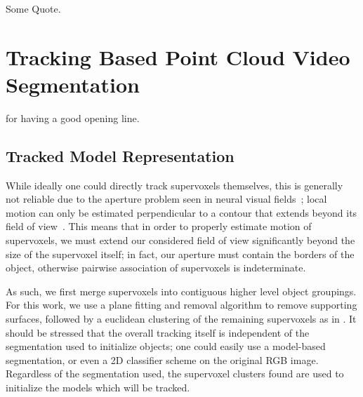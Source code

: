 \begin{savequote}[75mm]
Some Quote.
\end{savequote}


\chapter{Tracking Based Point Cloud Video Segmentation}
 for having a good opening line. 

\section{Tracked Model Representation}
While ideally one could directly track supervoxels themselves, this is generally not reliable due to the aperture problem seen in neural visual fields~\cite{MarrApertureProblem}; local motion can only be estimated perpendicular to a contour that extends beyond its field of view~\cite{shimojo1989}. This means that in order to properly estimate motion of supervoxels, we must extend our considered field of view significantly beyond the size of the supervoxel itself; in fact, our aperture must contain the borders of the object, otherwise pairwise association of supervoxels is indeterminate. 

As such, we first merge supervoxels into contiguous higher level object groupings. For this work, we use a plane fitting and removal algorithm to remove supporting surfaces, followed by a euclidean clustering of the remaining supervoxels as in \cite{Radu3dIsHere}. It should be stressed that the overall tracking itself is independent of the segmentation used to initialize objects; one could easily use a model-based segmentation, or even a 2D classifier scheme on the original RGB image. Regardless of the segmentation used, the supervoxel clusters found are used to initialize the models which will be tracked.

